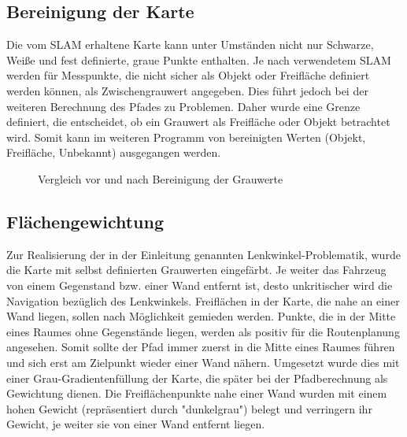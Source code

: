 \subsection{Bereinigung der Karte}

Die vom SLAM erhaltene Karte kann unter Umständen nicht nur Schwarze, Weiße und fest definierte, graue Punkte enthalten. Je nach verwendetem SLAM werden für Messpunkte, die nicht sicher als Objekt oder Freifläche definiert werden können, als Zwischengrauwert angegeben. Dies führt jedoch bei der weiteren Berechnung des Pfades zu Problemen. Daher wurde eine Grenze definiert, die entscheidet, ob ein Grauwert als Freifläche oder Objekt betrachtet wird. Somit kann im weiteren Programm von bereinigten Werten (Objekt, Freifläche, Unbekannt) ausgegangen werden. 

\begin{figure}
\caption{Vergleich vor und nach Bereinigung der Grauwerte}
\label{fig:ungenaueKarte}
\end{figure}


\subsection{Flächengewichtung}
\label{sec:gewichtung}

Zur Realisierung der in der Einleitung genannten Lenkwinkel-Problematik, wurde die Karte mit selbst definierten Grauwerten eingefärbt. Je weiter das Fahrzeug von einem Gegenstand bzw. einer Wand entfernt ist, desto unkritischer wird die Navigation bezüglich des Lenkwinkels.
Freiflächen in der Karte, die nahe an einer Wand liegen, sollen nach Möglichkeit gemieden werden. Punkte, die in der Mitte eines Raumes ohne Gegenstände liegen, werden als positiv für die Routenplanung angesehen. 
Somit sollte der Pfad immer zuerst in die Mitte eines Raumes führen und sich erst am Zielpunkt wieder einer Wand nähern. 
Umgesetzt wurde dies mit einer Grau-Gradientenfüllung der Karte, die später bei der Pfadberechnung als Gewichtung dienen. Die Freiflächenpunkte nahe einer Wand wurden mit einem hohen Gewicht (repräsentiert durch "dunkelgrau") belegt und verringern ihr Gewicht, je weiter sie von einer Wand entfernt liegen. 

